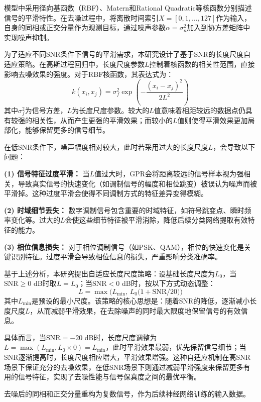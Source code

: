 \documentclass[conference]{IEEEtran}
\begin{document}
模型中采用径向基函数（RBF）、Matern和Rational Quadratic等核函数分别描述信号的平滑特性。在去噪过程中，将离散时间索引$X=[0,1,\ldots,127]$作为输入，自身的同相或正交分量作为观测目标，通过噪声参数$\alpha=\sigma_n^2$加入到协方差矩阵中实现噪声抑制。

为了适应不同SNR条件下信号的平滑需求，本研究设计了基于SNR的长度尺度自适应策略。在高斯过程回归中，长度尺度参数$L$控制着核函数的相关性范围，直接影响去噪效果的强度。对于RBF核函数，其表达式为：
\begin{equation}
k(x_i, x_j) = \sigma_f^2 \exp\left(-\frac{(x_i - x_j)^2}{2L^2}\right)
\end{equation}
其中$\sigma_f^2$为信号方差，$L$为长度尺度参数。较大的$L$值意味着相距较远的数据点仍具有较强的相关性，从而产生更强的平滑效果；而较小的$L$值则使得平滑效果更加局部化，能够保留更多的信号细节。

在低SNR条件下，噪声幅度相对较大，此时若采用过大的长度尺度$L$，会导致以下问题：

\textbf{(1) 信号特征过度平滑：} 当$L$值过大时，GPR会将距离较远的信号样本视为强相关，导致真实信号的快速变化（如调制信号的幅度和相位跳变）被误认为噪声而被平滑掉。这种过度平滑会使得不同调制方式的特征差异变得模糊。

\textbf{(2) 时域细节丢失：} 数字调制信号包含重要的时域特征，如符号跳变点、瞬时频率变化等。过大的$L$会使这些细节特征被平滑消除，降低后续分类网络提取有效特征的能力。

\textbf{(3) 相位信息损失：} 对于相位调制信号（如PSK、QAM），相位的快速变化是关键识别特征。过度平滑会导致相位信息的损失，严重影响分类准确率。

基于上述分析，本研究提出自适应长度尺度策略：设基础长度尺度为$L_0$，当$\mathrm{SNR}\ge0$ dB时取$L=L_0$；当$\mathrm{SNR}<0$ dB时，按以下方式动态调整：
\begin{equation}
L = \max\bigl(L_{\min},\,L_0\bigl(1+\mathrm{SNR}/20\bigr)\bigr)
\end{equation}
其中$L_{\min}$是预设的最小尺度。该策略的核心思想是：随着SNR的降低，逐渐减小长度尺度$L$，从而减弱平滑效果，在去除噪声的同时最大限度地保留信号的有效信息。

具体而言，当$\mathrm{SNR}=-20$ dB时，长度尺度调整为$L=\max(L_{\min}, L_0 \times 0)=L_{\min}$，此时平滑效果最弱，优先保留信号细节；当SNR逐渐提高时，长度尺度相应增大，平滑效果增强。这种自适应机制在高SNR场景下保证充分的去噪效果，在低SNR场景下则通过减弱平滑强度来保留更多有用的信号特征，实现了去噪性能与信号保真度之间的最优平衡。

去噪后的同相和正交分量重构为复数信号，作为后续神经网络训练的输入数据。
\end{document}
